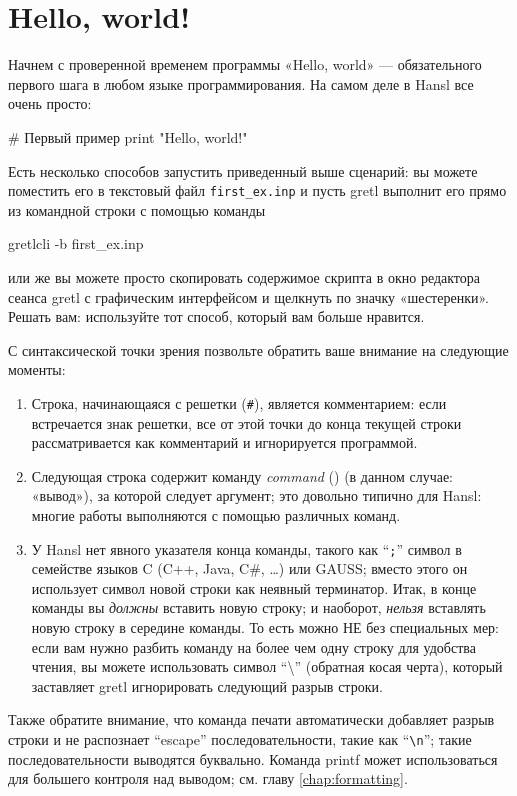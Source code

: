 \chapter{Hello, world!}
\label{chap:hello}

Начнем с проверенной временем программы «Hello, world» ---
обязательного первого шага в любом языке программирования. На самом
деле в Hansl все очень просто:
\begin{code}
  # Первый пример
  print "Hello, world!"
\end{code}

Есть несколько способов запустить приведенный выше сценарий: вы можете
поместить его в текстовый файл \texttt{first\_ex.inp} и пусть gretl
выполнит его прямо из командной строки с помощью команды
\begin{code}
  gretlcli -b first_ex.inp
\end{code}
или же вы можете просто скопировать содержимое скрипта в окно
редактора сеанса gretl с графическим интерфейсом и щелкнуть по значку
«шестеренки». Решать вам: используйте тот способ, который вам больше
нравится.

С синтаксической точки зрения позвольте обратить ваше внимание на
следующие моменты:
\begin{enumerate}
\item Строка, начинающаяся с решетки (\texttt{\#}), является
  комментарием: если встречается знак решетки, все от этой точки до
  конца текущей строки рассматривается как комментарий и игнорируется
  программой.
\item Следующая строка содержит команду \emph{command} ()
  (в данном случае: «вывод»), за которой следует аргумент; это
  довольно типично для Hansl: многие работы выполняются с помощью
  различных команд.
\item У Hansl нет явного указателя конца команды, такого как
  ``\texttt{;}'' символ в семействе языков C (C++, Java, C\#, \ldots)
  или GAUSS; вместо этого он использует символ новой строки как
  неявный терминатор. Итак, в конце команды вы \emph{должны} вставить
  новую строку; и наоборот, \emph{нельзя} вставлять новую строку в
  середине команды. То есть можно НЕ без специальных мер: если вам
  нужно разбить команду на более чем одну строку для удобства чтения,
  вы можете использовать символ ``\textbackslash'' (обратная косая
  черта), который заставляет gretl игнорировать следующий разрыв
  строки.
 \end{enumerate}

 Также обратите внимание, что команда печати  автоматически
 добавляет разрыв строки и не распознает ``escape''
 последовательности, такие как ``\verb|\n|''; такие последовательности
 выводятся буквально. Команда printf может использоваться для большего
 контроля над выводом; см. главу \ref{chap:formatting}.


